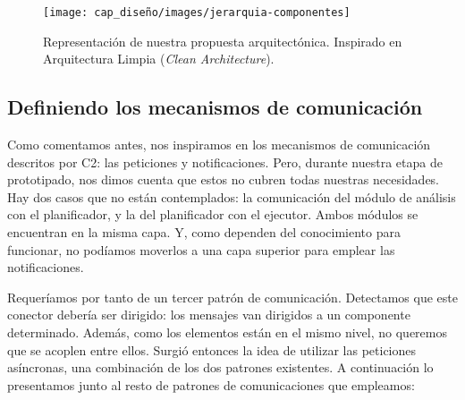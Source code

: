 \begin{figure}[htb]
  \centering
  \texttt{[image: cap\_diseño/images/jerarquia-componentes]}
  \caption[Representación de nuestra propuesta arquitectónica. Inspirado en Arquitectura Limpia (\emph{Clean Architecture}).]{Representación de nuestra propuesta arquitectónica. Inspirado en Arquitectura Limpia (\emph{Clean Architecture}). \footnotemark }
  \label{fig:clean-mapek-architecture}
\end{figure}


\subsection{Definiendo los mecanismos de comunicación}

Como comentamos antes, nos inspiramos en los mecanismos de comunicación descritos por C2: las peticiones y notificaciones. Pero, durante nuestra etapa de prototipado, nos dimos cuenta que estos no cubren todas nuestras necesidades. Hay dos casos que no están contemplados: la comunicación del módulo de análisis con el planificador, y la del planificador con el ejecutor. Ambos módulos se encuentran en la misma capa. Y, como dependen del conocimiento para funcionar, no podíamos moverlos a una capa superior para emplear las notificaciones.

Requeríamos por tanto de un tercer patrón de comunicación. Detectamos que este conector debería ser dirigido: los mensajes van dirigidos a un componente determinado. Además, como los elementos están en el mismo nivel, no queremos que se acoplen entre ellos. Surgió entonces la idea de utilizar las peticiones asíncronas, una combinación de los dos patrones existentes. A continuación lo presentamos junto al resto de patrones de comunicaciones que empleamos:

